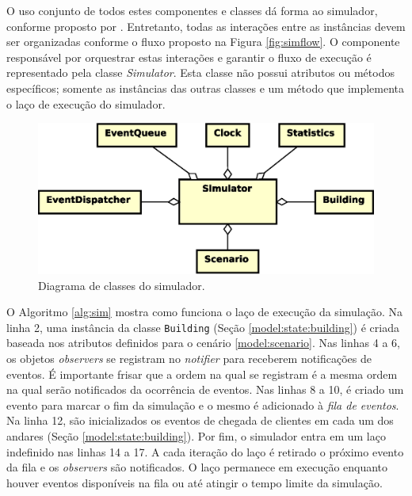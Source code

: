 O uso conjunto de todos estes componentes e classes dá forma ao simulador,
conforme proposto por \cite{Law,Banks}. Entretanto, todas as interações entre as
instâncias devem ser organizadas conforme o fluxo proposto na Figura
\ref{fig:simflow}. O componente responsável por orquestrar estas interações e
garantir o fluxo de execução é representado pela classe \textit{Simulator}. Esta
classe não possui atributos ou métodos específicos; somente as instâncias das
outras classes e um método que implementa o laço de execução do simulador.

\begin{figure}[htb!]
  \centering
  \includegraphics[scale=0.6]{img/Simulator}
  \caption{Diagrama de classes do simulador.}
\label{fig:diagram:simulator}
\end{figure}

O Algoritmo \ref{alg:sim} mostra como funciona o laço de execução da simulação.
Na linha 2, uma instância da classe \texttt{Building} (Seção
\ref{model:state:building}) é criada baseada nos atributos definidos para o
cenário \ref{model:scenario}. Nas linhas 4 a 6, os objetos \textit{observers} se
registram no \textit{notifier} para receberem notificações de eventos. É
importante frisar que a ordem na qual se registram é a mesma ordem na qual serão
notificados da ocorrência de eventos. Nas linhas 8 a 10, é criado um evento para
marcar o fim da simulação e o mesmo é adicionado à \textit{fila de eventos}. Na
linha 12, são inicializados os eventos de chegada de clientes em cada um dos
andares (Seção \ref{model:state:building}). Por fim, o simulador entra em um
laço indefinido nas linhas 14 a 17. A cada iteração do laço é retirado o próximo
evento da fila e os \textit{observers} são notificados. O laço permanece em
execução enquanto houver eventos disponíveis na fila ou até atingir o tempo
limite da simulação.

